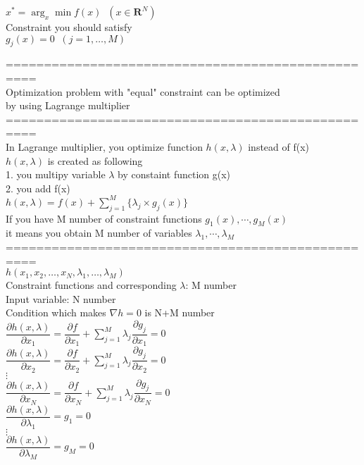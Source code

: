 \documentclass{article}
\begin{document}
$x^{\ast} = \arg_x \min f(x) \;\; (x \in \mathbf{R}^N)$ \\  

Constraint you should satisfy \\ 
$g_j(x)=0 \;\; (j=1, \ldots, M)$

==================================================\\
Optimization problem with "equal" constraint can be optimized \\ 
by using Lagrange multiplier \\ 

==================================================\\
In Lagrange multiplier, you optimize function $h(x,\lambda)$ instead of f(x) \\

$h(x,\lambda)$ is created as following \\ 
1. you multipy variable $\lambda$ by constaint function g(x) \\
2. you add f(x) \\

$h(x, \lambda) = f(x) + \sum\limits_{j=1}^M \{\lambda_j \times g_j(x)\}$ \\ 

If you have M number of constraint functions $g_1(x),\cdots,g_M(x)$ \\ 
it means you obtain M number of variables $\lambda_1,\cdots,\lambda_M$ \\ 

==================================================\\
$h(x_1, x_2, \ldots , x_N, \lambda_1, \ldots , \lambda_M)$ \\ 

Constraint functions and corresponding $\lambda$: M number \\ 
Input variable: N number \\ 

Condition which makes $\nabla h =0$ is N+M number \\ 


$\dfrac{\partial h(x, \lambda)}{\partial x_1} = \dfrac{\partial f}{\partial x_1} + \sum\limits_{j=1}^M \lambda_j\dfrac{\partial g_j}{\partial x_1} = 0$ \\
$\dfrac{\partial h(x, \lambda)}{\partial x_2} = \dfrac{\partial f}{\partial x_2} + \sum\limits_{j=1}^M \lambda_j\dfrac{\partial g_j}{\partial x_2} = 0$ \\
$\vdots$ \\
$\dfrac{\partial h(x, \lambda)}{\partial x_N} = \dfrac{\partial f}{\partial x_N} + \sum\limits_{j=1}^M \lambda_j\dfrac{\partial g_j}{\partial x_N} = 0$ \\
$\dfrac{\partial h(x, \lambda)}{\partial \lambda_1} = g_1 = 0$ \\
$\vdots$ \\
$\dfrac{\partial h(x, \lambda)}{\partial \lambda_M} = g_M = 0 $ \\ 
\end{document}
